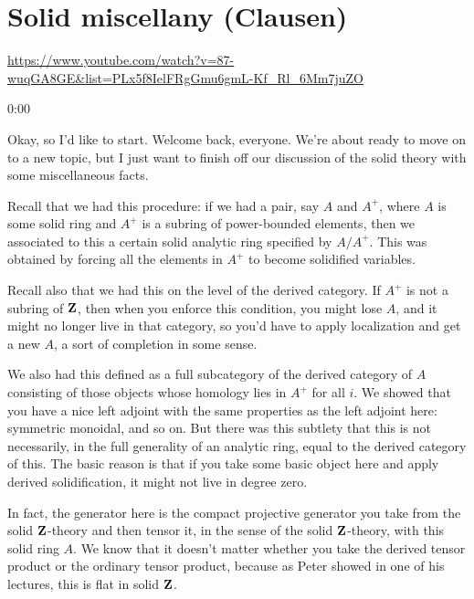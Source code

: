 
\section{\ufs Solid miscellany (Clausen)}

\url{https://www.youtube.com/watch?v=87-wuqGA8GE&list=PLx5f8IelFRgGmu6gmL-Kf_Rl_6Mm7juZO}
\renewcommand{\yt}[2]{\href{https://www.youtube.com/watch?v=87-wuqGA8GE&list=PLx5f8IelFRgGmu6gmL-Kf_Rl_6Mm7juZO&t=#1}{#2}}
\vspace{1em}

\begin{unfinished}{0:00}

Okay, so I'd like to start. Welcome back, everyone. We're about ready to move on to a new topic, but I just want to finish off our discussion of the solid theory with some miscellaneous facts.

Recall that we had this procedure: if we had a pair, say $A$ and $A^+$, where $A$ is some solid ring and $A^+$ is a subring of power-bounded elements, then we associated to this a certain solid analytic ring specified by $A/A^+$. This was obtained by forcing all the elements in $A^+$ to become solidified variables.

Recall also that we had this on the level of the derived category. If $A^+$ is not a subring of $\mathbf Z$, then when you enforce this condition, you might lose $A$, and it might no longer live in that category, so you'd have to apply localization and get a new $A$, a sort of completion in some sense.

We also had this defined as a full subcategory of the derived category of $A$ consisting of those objects whose homology lies in $A^+$ for all $i$. We showed that you have a nice left adjoint with the same properties as the left adjoint here: symmetric monoidal, and so on. But there was this subtlety that this is not necessarily, in the full generality of an analytic ring, equal to the derived category of this. The basic reason is that if you take some basic object here and apply derived solidification, it might not live in degree zero.

In fact, the generator here is the compact projective generator you take from the solid $\mathbf Z$-theory and then tensor it, in the sense of the solid $\mathbf Z$-theory, with this solid ring $A$. We know that it doesn't matter whether you take the derived tensor product or the ordinary tensor product, because as Peter showed in one of his lectures, this is flat in solid $\mathbf Z$.


\end{unfinished}
